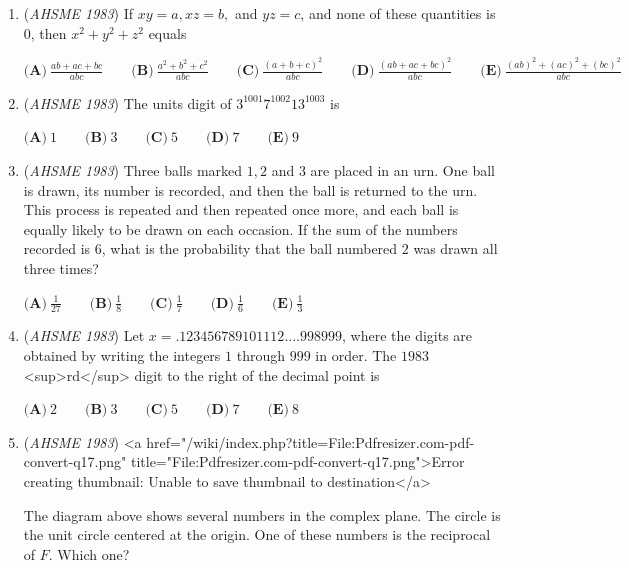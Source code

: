 \begin{enumerate}
 $\textbf{(A)} \ \frac{1}{3} \qquad  \textbf{(B)} \ \frac{1}{2 \sqrt 3} \qquad  \textbf{(C)}\ \frac{1}{3\sqrt 3}\qquad \textbf{(D)}\ \frac{1}{\sqrt{42}}\qquad \textbf{(E)}\ \text{none of these}$


	\item (\textit{AHSME 1983}) If $xy = a, xz =b,$ and $yz = c$, and none of these quantities is $0$, then $x^2+y^2+z^2$ equals


 $\textbf{(A)}\ \frac{ab+ac+bc}{abc}\qquad \textbf{(B)}\ \frac{a^2+b^2+c^2}{abc}\qquad \textbf{(C)}\ \frac{(a+b+c)^2}{abc}\qquad \textbf{(D)}\ \frac{(ab+ac+bc)^2}{abc}\qquad \textbf{(E)}\ \frac{(ab)^2+(ac)^2+(bc)^2}{abc}$


	\item (\textit{AHSME 1983}) The units digit of $3^{1001} 7^{1002} 13^{1003}$ is


 $\textbf{(A)}\ 1\qquad \textbf{(B)}\ 3\qquad \textbf{(C)}\ 5\qquad \textbf{(D)}\ 7\qquad \textbf{(E)}\ 9$


	\item (\textit{AHSME 1983}) Three balls marked $1,2$ and $3$ are placed in an urn. One ball is drawn, its number is recorded, and then the ball is returned to the urn. This process is repeated and then repeated once more, and each ball is equally likely to be drawn on each occasion. If the sum of the numbers recorded is $6$, what is the probability that the ball numbered $2$ was drawn all three times? 


 $\textbf{(A)} \ \frac{1}{27} \qquad  \textbf{(B)} \ \frac{1}{8} \qquad  \textbf{(C)} \ \frac{1}{7} \qquad  \textbf{(D)} \ \frac{1}{6} \qquad \textbf{(E)}\ \frac{1}{3}$


	\item (\textit{AHSME 1983}) Let $x = .123456789101112....998999$, where the digits are obtained by writing the integers $1$ through $999$ in order. 
The $1983$<sup>rd</sup> digit to the right of the decimal point is


 $\textbf{(A)}\ 2\qquad \textbf{(B)}\ 3\qquad \textbf{(C)}\ 5\qquad \textbf{(D)}\ 7\qquad \textbf{(E)}\ 8$


	\item (\textit{AHSME 1983}) <a href="/wiki/index.php?title=File:Pdfresizer.com-pdf-convert-q17.png" title="File:Pdfresizer.com-pdf-convert-q17.png">Error creating thumbnail: Unable to save thumbnail to destination</a>


 The diagram above shows several numbers in the complex plane. The circle is the unit circle centered at the origin. 
One of these numbers is the reciprocal of $F$. Which one? 



\end{enumerate}
